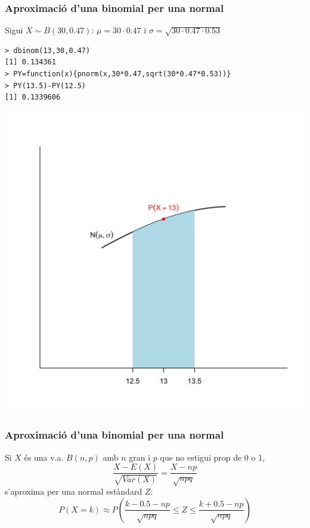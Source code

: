 \documentclass[12pt,t]{beamer}\usepackage[]{graphicx}\usepackage[]{color}
\renewcommand{\leq}{\leqslant}
\theoremstyle{plain}
\theoremstyle{definition}
\begin{document}
\begin{frame}[fragile]
\frametitle{Aproximació d'una binomial per una normal}
\vspace*{-1ex}

Sigui $X\sim B(30,0.47)$: $\mu\!=\!30\!\cdot\! 0.47$ i $\sigma\!=\!\sqrt{30\!\cdot\! 0.47\!\cdot\! 0.53}$
{\footnotesize \begin{verbatim}
> dbinom(13,30,0.47)
[1] 0.134361
> PY=function(x){pnorm(x,30*0.47,sqrt(30*0.47*0.53))}
> PY(13.5)-PY(12.5)
[1] 0.1339606
\end{verbatim}
}
\vspace*{-5ex}

\begin{center}
\includegraphics[width=0.6\linewidth]{binomvsnorm1}
\end{center}



\end{frame}



\begin{frame}
\frametitle{Aproximació d'una binomial per una normal}
\vspace*{-2ex}

Si $X$ és una v.a. $B(n,p)$ amb $n$ gran i $p$ que no estigui prop de 0 o 1,
$$
\frac{X-E(X)}{\sqrt{Var(X)}}=\frac{X-np}{\sqrt{npq}}
$$
s'aproxima per una normal estàndard $Z$:
$$
P(X=k) \approx P\left(\frac{k-0.5-np}{\sqrt{npq}}\leq Z \leq \frac{k+0.5-np}{\sqrt{npq}}\right)
$$


\end{frame}
\end{document}
